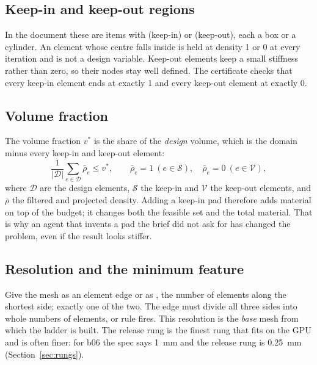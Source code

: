 \subsection{Keep-in and keep-out regions}
In the document these are  items with   (keep-in) or  (keep-out), each
a box or a cylinder. An element whose centre falls inside is held at density 1 or 0 at every iteration and is not a
design variable. Keep-out elements keep a small stiffness rather than zero, so their nodes stay well defined. The
certificate checks that every keep-in element ends at exactly 1 and every keep-out element at exactly 0.

\subsection{Volume fraction}\label{sec:vf}
The volume fraction $v^*$ is the share of the \emph{design} volume, which is the domain minus every keep-in and keep-out
element:
\begin{equation}
  \frac{1}{|\mathcal D|}\sum_{e\in\mathcal D}\bar\rho_e \le v^*,\qquad \bar\rho_e = 1\ (e\in\mathcal S),\quad
  \bar\rho_e = 0\ (e\in\mathcal V),
\end{equation}
where $\mathcal D$ are the design elements, $\mathcal S$ the keep-in and $\mathcal V$ the keep-out elements, and
$\bar\rho$ the filtered and projected density. Adding a keep-in pad therefore adds material on top of the budget; it
changes both the feasible set and the total material. That is why an agent that invents a pad the brief did not ask for
has changed the problem, even if the result looks stiffer.

\subsection{Resolution and the minimum feature}
Give the mesh as an element edge  or as , the number of elements along the shortest
side; exactly one of the two. The edge must divide all three sides into whole numbers of elements, or rule 
fires. This resolution is the \emph{base} mesh from which the ladder is built. The release rung is the finest rung that
fits on the GPU and is often finer: for b06 the spec says 1~mm and the release rung is 0.25~mm
(Section~\ref{sec:rungs}).

